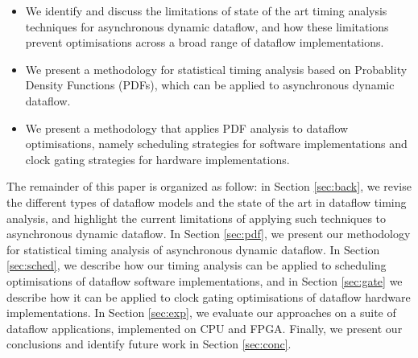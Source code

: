 \begin{itemize}
\item We identify and discuss the limitations of state of the art timing analysis techniques for asynchronous dynamic dataflow, and how these limitations prevent optimisations across a broad range of dataflow implementations.
\item We present a methodology for statistical timing analysis based on Probablity Density Functions (PDFs), which can be applied to asynchronous dynamic dataflow.
\item We present a methodology that applies PDF analysis to dataflow optimisations, namely scheduling strategies for software implementations and clock gating strategies for hardware implementations.
\end{itemize}

\par The remainder of this paper is organized as follow: in Section \ref{sec:back}, we revise the different types of dataflow models and the state of the art in dataflow timing analysis, and highlight the current limitations of applying such techniques to asynchronous dynamic dataflow. In Section \ref{sec:pdf}, we present our methodology for statistical timing analysis of asynchronous dynamic dataflow. In Section \ref{sec:sched}, we describe how our timing analysis can be applied to scheduling optimisations of dataflow software implementations, and in Section \ref{sec:gate} we describe how it can be applied to clock gating optimisations of dataflow hardware implementations. In Section \ref{sec:exp}, we evaluate our approaches on a suite of dataflow applications, implemented on CPU and FPGA. Finally, we present our conclusions and identify future work in Section \ref{sec:conc}. 



